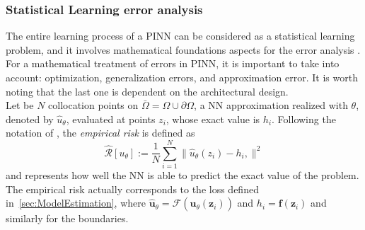 \documentclass[pdflatex,sn-basic]{sn-jnl}%
\theoremstyle{thmstyleone}%
\theoremstyle{thmstyletwo}%
\theoremstyle{thmstylethree}%
\begin{document}
\subsubsection{Statistical Learning error analysis}

The entire learning process of a PINN can be considered as a statistical learning problem, and it involves mathematical foundations aspects for the error analysis \citep{Kut2022_MathematicsArtificialIntelligence_Kut}.
%
%
For a mathematical treatment of errors in PINN, it is important to take into account: optimization, generalization errors, and approximation error.
It is worth noting that the last one is dependent on the architectural design.  %
\\
Let be $N$ collocation points on $\bar{\Omega} = \Omega \cup \partial \Omega$,
a  NN approximation realized with $\theta$, denoted by $\hat{u}_\theta$, evaluated at points $z_i$, whose exact value is $h_i$.
Following the notation of \cite{Kut2022_MathematicsArtificialIntelligence_Kut}, the \emph{empirical risk} is defined as
\begin{equation}\label{eq:risk1} %
\widehat{\mathcal{R}}[u_\theta] := \frac{1}{N} \sum_{i=1}^{N} \|
\hat{u}_\theta(z_i) - h_i,
\|^2    
\end{equation}
and represents how well the NN is able to predict the exact value of the problem. The  empirical risk actually corresponds to the loss defined in~\ref{sec:ModelEstimation}, where $\hat{\bm{u}}_\theta = \mathcal{F} (\hat{\bm{u}}_\theta(\bm{z}_i))$  and $h_i=\bm{f}(\bm{z}_i)$ and similarly for the boundaries.
\end{document}
